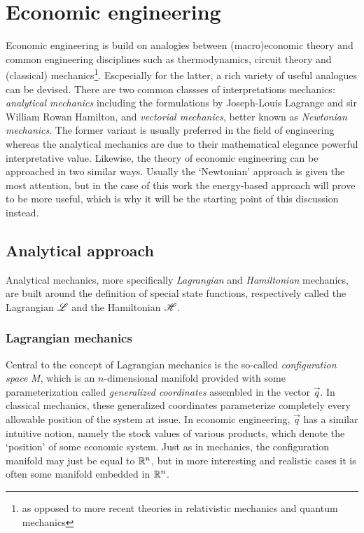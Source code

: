 \chapter{Economic engineering}
Economic engineering is build on analogies between (macro)economic theory and common engineering disciplines such as thermodynamics, circuit theory and (classical) mechanics\footnote{as opposed to more recent theories in relativistic mechanics and quantum mechanics}. Escpecially for the latter, a rich variety of useful analogues can be devised. There are two common classses of interpretations mechanics: \emph{analytical mechanics} including the formulations by Joseph-Louis Lagrange and sir William Rowan Hamilton, and \emph{vectorial mechanics}, better known as \emph{Newtonian mechanics}. The former variant is usually preferred in the field of engineering whereas the analytical mechanics are due to their mathematical elegance powerful interpretative value. Likewise, the theory of economic engineering can be approached in two similar ways. Usually the `Newtonian' approach is given the most attention, but in the case of this work the energy-based approach will prove to be more useful, which is why it will be the starting point of this discussion instead.

\section{Analytical approach}
Analytical mechanics, more specifically \emph{Lagrangian} and \emph{Hamiltonian} mechanics, are built around the definition of special state functions, respectively called the Lagrangian \(\mathscr{L}\) and the Hamiltonian \(\mathscr{H}\).

\subsection{Lagrangian mechanics}
Central to the concept of Lagrangian mechanics is the so-called \emph{configuration space} \(M\), which is an \(n\)-dimensional manifold provided with some parameterization called \emph{generalized coordinates} assembled in the vector \(\vec{q}\). In classical mechanics, these generalized coordinates parameterize completely every allowable position of the system at issue. In economic engineering, \(\vec{q}\) has a similar intuitive notion, namely the stock values of various products, which denote the `position' of some economic system. Just as in mechanics, the configuration manifold may just be equal to \(\mathbb{R}^n\), but in more interesting and realistic cases it is often some manifold embedded in \(\mathbb{R}^n\). 

